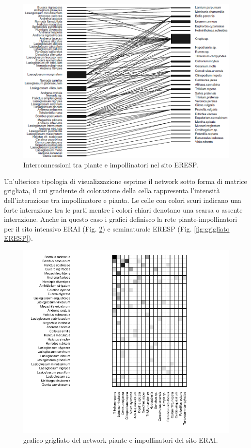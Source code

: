\documentclass[main.tex]{subfiles}
\begin{document}
\begin{figure}[H]
\centering
\includegraphics[width=1\textwidth]{./Immagini/Plotweb_Network_Api_Piante_ESP.png}
\caption{Interconnessioni tra piante e impollinatori nel sito ERESP.}
\label{fig:Interconnessioni ERESP}
\end{figure}

Un’ulteriore tipologia di visualizzazione esprime il network sotto forma di matrice grigliata, il cui gradiente di colorazione della cella rappresenta l’intensità dell’interazione tra impollinatore e pianta. Le celle con colori scuri indicano una forte interazione tra le parti mentre i colori chiari denotano una scarsa o assente interazione. Anche in questo caso i grafici definisco la rete piante-impollinatori per il sito intensivo ERAI (Fig. \ref{fig:grigliato ERAI}) e seminaturale ERESP (Fig. \ref{fig:grigliato ERESP}).

\begin{figure}[H]
\centering
\includegraphics[width=1.2\textwidth]{./Immagini/visweb_Network_Api_Piante_AI.pdf}
\caption{grafico grigliato del network piante e impollinatori del sito ERAI.}
\label{fig:grigliato ERAI}
\end{figure}
\end{document}

